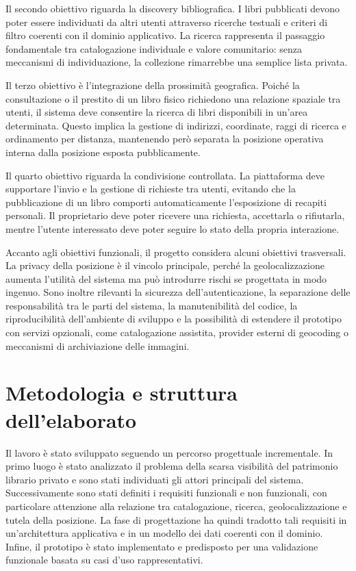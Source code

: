 Il secondo obiettivo riguarda la discovery bibliografica. I libri pubblicati devono poter essere individuati da altri utenti attraverso ricerche testuali e criteri di filtro coerenti con il dominio applicativo. La ricerca rappresenta il passaggio fondamentale tra catalogazione individuale e valore comunitario: senza meccanismi di individuazione, la collezione rimarrebbe una semplice lista privata.

Il terzo obiettivo è l'integrazione della prossimità geografica. Poiché la consultazione o il prestito di un libro fisico richiedono una relazione spaziale tra utenti, il sistema deve consentire la ricerca di libri disponibili in un'area determinata. Questo implica la gestione di indirizzi, coordinate, raggi di ricerca e ordinamento per distanza, mantenendo però separata la posizione operativa interna dalla posizione esposta pubblicamente.

Il quarto obiettivo riguarda la condivisione controllata. La piattaforma deve supportare l'invio e la gestione di richieste tra utenti, evitando che la pubblicazione di un libro comporti automaticamente l'esposizione di recapiti personali. Il proprietario deve poter ricevere una richiesta, accettarla o rifiutarla, mentre l'utente interessato deve poter seguire lo stato della propria interazione.

Accanto agli obiettivi funzionali, il progetto considera alcuni obiettivi trasversali. La privacy della posizione è il vincolo principale, perché la geolocalizzazione aumenta l'utilità del sistema ma può introdurre rischi se progettata in modo ingenuo. Sono inoltre rilevanti la sicurezza dell'autenticazione, la separazione delle responsabilità tra le parti del sistema, la manutenibilità del codice, la riproducibilità dell'ambiente di sviluppo e la possibilità di estendere il prototipo con servizi opzionali, come catalogazione assistita, provider esterni di geocoding o meccanismi di archiviazione delle immagini.

\section{Metodologia e struttura dell'elaborato}
\label{sec:metodologia-struttura}

Il lavoro è stato sviluppato seguendo un percorso progettuale incrementale. In primo luogo è stato analizzato il problema della scarsa visibilità del patrimonio librario privato e sono stati individuati gli attori principali del sistema. Successivamente sono stati definiti i requisiti funzionali e non funzionali, con particolare attenzione alla relazione tra catalogazione, ricerca, geolocalizzazione e tutela della posizione. La fase di progettazione ha quindi tradotto tali requisiti in un'architettura applicativa e in un modello dei dati coerenti con il dominio. Infine, il prototipo è stato implementato e predisposto per una validazione funzionale basata su casi d'uso rappresentativi.

